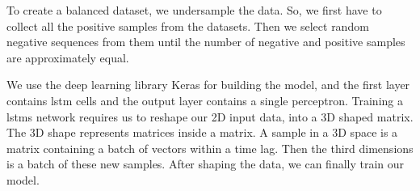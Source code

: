 To create a balanced dataset, we undersample the data. So, we first have to collect all the positive samples from the datasets. Then we select random negative sequences from them until the number of negative and positive samples are approximately equal.

We use the deep learning library Keras for building the model, and the first layer contains \ac{lstm} cells and the output layer contains a single perceptron. Training a \acp{lstm} network requires us to reshape our 2D input data, into a 3D shaped matrix. The 3D shape represents matrices inside a matrix. A sample in a 3D space is a matrix containing a batch of vectors within a time lag. Then the third dimensions is a batch of these new samples. After shaping the data, we can finally train our model.
